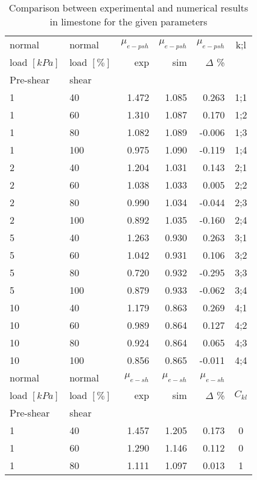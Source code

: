 \begin{table}[!htb]
  \centering
  \caption{Comparison between experimental and numerical results in limestone for the given parameters}
    \begin{tabular}{|llrrrc|}
    \hline
    normal  & normal  &   $\mu_{e-psh}$    &    $\mu_{e-psh}$   & $\mu_{e-psh}$ & k;l \\
    load $[kPa]$ & load $[\%]$ & exp   & sim   & $\Delta$ \% &  \\
    Pre-shear & shear &  &  &  &  \\
    \hline
    1     & 40    & 1.472 & 1.085 & 0.263 & 1;1 \\
    1     & 60    & 1.310 & 1.087 & 0.170 & 1;2 \\
    1     & 80    & 1.082 & 1.089 & -0.006 & 1;3 \\
    1     & 100   & 0.975 & 1.090 & -0.119 & 1;4 \\
    2     & 40    & 1.204 & 1.031 & 0.143 & 2;1 \\
    2     & 60    & 1.038 & 1.033 & 0.005 & 2;2 \\
    2     & 80    & 0.990 & 1.034 & -0.044 & 2;3 \\
    2     & 100   & 0.892 & 1.035 & -0.160 & 2;4 \\
    5     & 40    & 1.263 & 0.930 & 0.263 & 3;1 \\
    5     & 60    & 1.042 & 0.931 & 0.106 & 3;2 \\
    5     & 80    & 0.720 & 0.932 & -0.295 & 3;3 \\
    5     & 100   & 0.879 & 0.933 & -0.062 & 3;4 \\
    10    & 40    & 1.179 & 0.863 & 0.269 & 4;1 \\
    10    & 60    & 0.989 & 0.864 & 0.127 & 4;2 \\
    10    & 80    & 0.924 & 0.864 & 0.065 & 4;3 \\
    10    & 100   & 0.856 & 0.865 & -0.011 & 4;4 \\   
    \hline
    \hline
    normal  & normal  &  $\mu_{e-sh}$     &   $\mu_{e-sh}$    & $\mu_{e-sh}$ &  \\
    load $[kPa]$ & load $[\%]$ & exp   & sim   & $\Delta$ \% & $C_{kl}$  \\
    Pre-shear & shear &  &  &  & \\
    \hline
    1     & 40    & 1.457 & 1.205 & 0.173 & 0 \\
    1     & 60    & 1.290 & 1.146 & 0.112 & 0 \\
    1     & 80    & 1.111 & 1.097 & 0.013 & 1 \\

\end{tabular}
\end{table}
